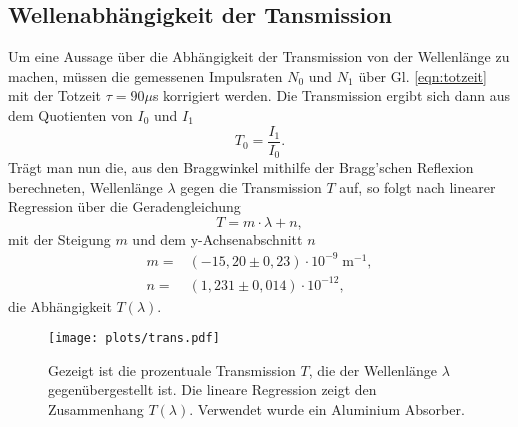 \subsection{Wellenabhängigkeit der Tansmission}
Um eine Aussage über die Abhängigkeit der Transmission von der Wellenlänge
zu machen, müssen die gemessenen Impulsraten $N_0$ und $N_1$ über Gl. \ref{eqn:totzeit}
mit der Totzeit $\tau=90\mu$s korrigiert werden. Die Transmission ergibt sich dann aus dem Quotienten
von $I_0$ und $I_1$
\begin{equation}
    T_0=\frac{I_1}{I_0}.
    \label{eqn:trans}
\end{equation}
Trägt man nun die, aus den Braggwinkel mithilfe der Bragg'schen Reflexion
berechneten, Wellenlänge $\lambda$ gegen die Transmission $T$ auf, so folgt
nach linearer Regression über die Geradengleichung
\begin{equation*}
    T=m\cdot \lambda + n,
\end{equation*}
mit der Steigung $m$ und dem y-Achsenabschnitt $n$
\begin{align*}
    m=&(-15,20\pm0,23)\cdot 10^{-9}\;\si{\m^{-1}},\\ 
    n=&(1,231\pm0,014)\cdot 10^{-12},
\end{align*}
die Abhängigkeit $T(\lambda).$
\begin{figure}[H]
    \centering
    \texttt{[image: plots/trans.pdf]}
    \caption{Gezeigt ist die prozentuale Transmission $T$, die der Wellenlänge $\lambda$
    gegenübergestellt ist. Die lineare Regression zeigt den Zusammenhang $T(\lambda)$.
    Verwendet wurde ein Aluminium Absorber.}
\end{figure}
\label{sub:trans}


